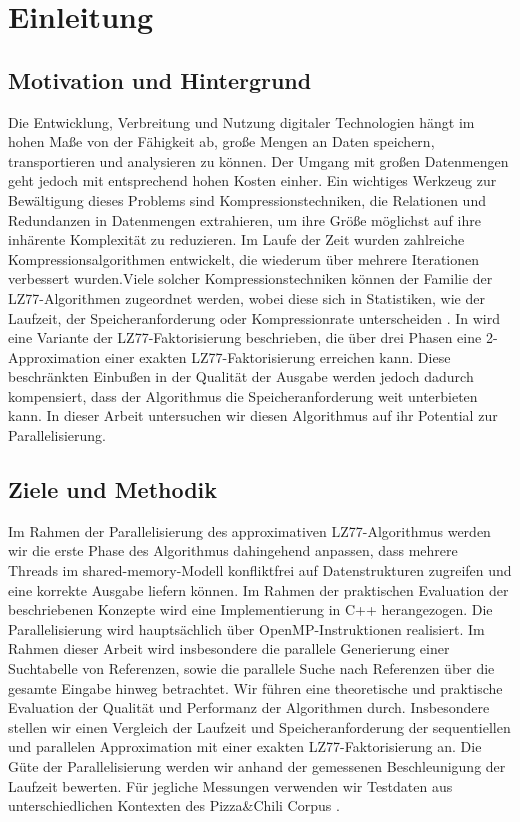 \chapter{Einleitung}
\section{Motivation und Hintergrund}
Die Entwicklung, Verbreitung und Nutzung digitaler Technologien hängt im hohen Maße von der Fähigkeit ab, große Mengen an Daten speichern, transportieren und
analysieren zu können. Der Umgang mit großen Datenmengen geht jedoch mit entsprechend hohen Kosten einher. Ein wichtiges Werkzeug zur Bewältigung dieses Problems
sind Kompressionstechniken, die Relationen und Redundanzen in Datenmengen extrahieren, um ihre Größe möglichst auf ihre inhärente Komplexität zu reduzieren. 
Im Laufe der Zeit wurden zahlreiche Kompressionsalgorithmen entwickelt, die wiederum über mehrere Iterationen verbessert wurden.Viele solcher Kompressionstechniken
können der Familie der LZ77-Algorithmen zugeordnet werden, wobei diese sich in Statistiken, wie der Laufzeit, der Speicheranforderung oder Kompressionrate unterscheiden
\cite{LemZiv}. In \cite{ApproxLZ77} wird eine Variante der LZ77-Faktorisierung beschrieben, die über drei Phasen eine 2-Approximation einer exakten LZ77-Faktorisierung
\cite{exactLemZiv} erreichen kann. Diese beschränkten Einbußen in der Qualität der Ausgabe werden jedoch dadurch kompensiert, dass der Algorithmus die Speicheranforderung
weit unterbieten kann. In dieser Arbeit untersuchen wir diesen Algorithmus auf ihr Potential zur Parallelisierung.

\section{Ziele und Methodik}
Im Rahmen der Parallelisierung des approximativen LZ77-Algorithmus werden wir die erste Phase des Algorithmus dahingehend anpassen, dass mehrere Threads im 
shared-memory-Modell konfliktfrei auf Datenstrukturen zugreifen und eine korrekte Ausgabe liefern können. Im Rahmen der praktischen Evaluation der
beschriebenen Konzepte wird eine Implementierung in C++ herangezogen. Die Parallelisierung wird hauptsächlich über OpenMP-Instruktionen \cite{openmp} realisiert.
Im Rahmen dieser Arbeit wird insbesondere die parallele Generierung einer Suchtabelle von Referenzen, sowie die parallele Suche nach Referenzen über die gesamte Eingabe
hinweg betrachtet. Wir führen eine theoretische und praktische Evaluation der Qualität und Performanz der Algorithmen durch. Insbesondere stellen wir einen Vergleich der
Laufzeit und Speicheranforderung der sequentiellen und parallelen Approximation mit einer exakten LZ77-Faktorisierung\cite{exactLemZiv} an. Die Güte der Parallelisierung
werden wir anhand der gemessenen Beschleunigung der Laufzeit bewerten. Für jegliche Messungen verwenden wir Testdaten aus unterschiedlichen Kontexten des 
Pizza\&Chili Corpus \cite{corpus}.